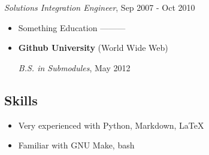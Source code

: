 \documentclass[]{article}
\begin{document}
\emph{Solutions Integration Engineer}, Sep 2007 - Oct 2010

\begin{itemize}
\item
  Something Education ---------
\item
  \textbf{Github University} (World Wide Web)

  \emph{B.S. in Submodules}, May 2012
\end{itemize}

\subsection{Skills}\label{skills}

\begin{itemize}
\item
  Very experienced with Python, Markdown, \LaTeX
\item
  Familiar with GNU Make, bash
\end{itemize}
\end{document}
